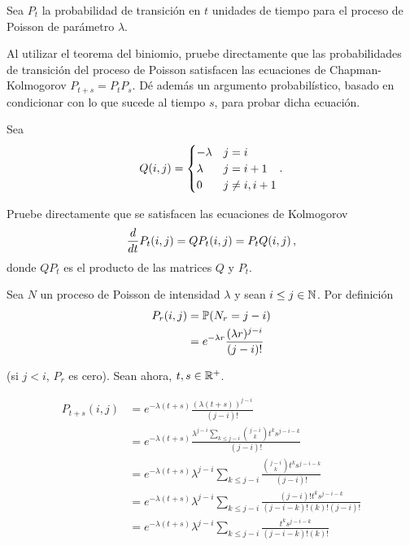 \begin{problema}
    Sea $P_t$ la probabilidad de transici\'on en $t$ unidades de tiempo para el proceso de Poisson de 
    par\'ametro $\lambda$. 

    Al utilizar el teorema del biniomio, pruebe directamente que las probabilidades de transici\'on del 
    proceso de Poisson satisfacen las ecuaciones de Chapman-Kolmogorov $P_{t+s}=P_tP_s$. D\'e adem\'as un 
    argumento probabil\'istico, basado en condicionar con lo que sucede al tiempo $s$, para probar dicha ecuaci\'on. 

    Sea
    \begin{align}\label{problema5_4:definicionQ}
        \imf{Q}{i,j}=
            \begin{cases}
                -\lambda    &   j   =       i     \\
                \lambda     &   j   =       i+1   \\
                0           &   j   \neq    i,i+1
            \end{cases}.
    \end{align}

    Pruebe directamente que se satisfacen las ecuaciones de Kolmogorov
    \begin{equation*} %
        \frac{d}{dt}\imf{P_t}{i,j}=\imf{QP_t}{i,j}=\imf{P_tQ}{i,j},
    \end{equation*}
    donde $QP_t$ es el producto de las matrices $Q$ y $P_t$.
\end{problema}

\afterstatement\pn

Sea $N$ un proceso de Poisson de intensidad $\lambda$ y sean $i \leq j \in \N$. Por definición
\begin{align}
    P_r(i, j)   &=  \P(N_r = j-i)   \\
                &=  e^{-\lambda r}   \frac{(\lambda r)^{j - i}}{(j - i)!}
\end{align}\pn

(si $j < i$, $P_r$ es cero). Sean ahora, $t,s \in \R^+$.

\begin{align}
    P_{t + s}(i,j)  &=  e^{-\lambda (t+s)}  \frac{(\lambda(t+s))^{j-i}}{(j-i)!}                                                 \\
                    &=  e^{-\lambda (t+s)}  \frac{\lambda^{j-i} \sum_{k \leq j-i} \binom{j-i}{k} t^k s^{j-i-k}}{(j-i)!}         \\
                    &=  e^{-\lambda (t+s)} \lambda^{j-i} \sum_{k \leq j-i} \frac{ \binom{j-i}{k} t^k s^{j-i-k}}{(j-i)!}         \\
                    &=  e^{-\lambda (t+s)} \lambda^{j-i} \sum_{k \leq j-i} \frac{ (j-i)! t^k s^{j-i-k}}{(j-i-k)!(k)!(j-i)!}     \\
                    &=  e^{-\lambda (t+s)} \lambda^{j-i} \sum_{k \leq j-i} \frac{ t^k s^{j-i-k}}{(j-i-k)!(k)!}     \\
\end{align}\pn

